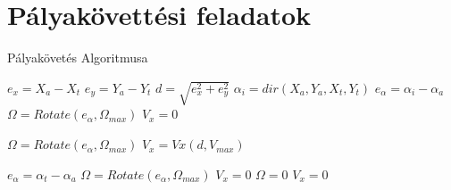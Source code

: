 \section{Pályakövettési feladatok}

\begin{algorithm}
   \caption{Pályakövetés Algoritmusa}
    \begin{algorithmic}[1]
      
       \State $e_x = X_a-X_t$
       \State $e_y = Y_a-Y_t$
       \State $d=\sqrt{e_x^2+e_y^2}$
       \State $\alpha_i=dir(X_a,Y_a,X_t,Y_t)$ 
       \State $e_\alpha=\alpha_i-\alpha_a$
             
                \State $\Omega = Rotate(e_\alpha,\Omega_{max}) $
                \State $V_x = 0 $
            \Else {}
                
                \State $\Omega = Rotate(e_\alpha,\Omega_{max}) $
                \State $V_x = Vx(d,V_{max}) $
            \EndIf
       \Else {}
            
            \State $e_\alpha=\alpha_t-\alpha_a$
             
                \State $\Omega =Rotate(e_\alpha,\Omega_{max}) $
                \State $V_x = 0 $
            \Else {}
                \State $\Omega = 0$
                \State $V_x = 0 $
            \EndIf
       \EndIf
        
       \EndFunction

\end{algorithmic}
\end{algorithm}
